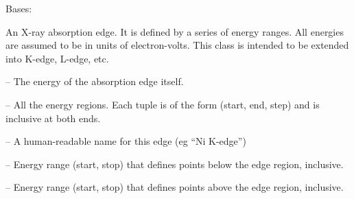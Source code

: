 \documentclass[letterpaper,10pt,english]{sphinxmanual}
\begin{document}
\begin{fulllineitems}
\label{\detokenize{xanespy:xanespy.edges.Edge}}
Bases: 

An X-ray absorption edge. It is defined by a series of energy
ranges. All energies are assumed to be in units of
electron-volts. This class is intended to be extended into K-edge,
L-edge, etc.

\begin{fulllineitems}
\label{\detokenize{xanespy:xanespy.edges.Edge.E_0}}
 -- The energy of the absorption edge itself.

\end{fulllineitems}


\begin{fulllineitems}
\label{\detokenize{xanespy:xanespy.edges.Edge.regions}}
 -- All the energy regions. Each tuple is of the form (start, end,
step) and is inclusive at both ends.

\end{fulllineitems}


\begin{fulllineitems}
\label{\detokenize{xanespy:xanespy.edges.Edge.name}}
 -- A human-readable name for this edge (eg ``Ni K-edge'')

\end{fulllineitems}


\begin{fulllineitems}
\label{\detokenize{xanespy:xanespy.edges.Edge.pre_edge}}
 -- Energy range (start, stop) that defines points below the edge
region, inclusive.

\end{fulllineitems}


\begin{fulllineitems}
\label{\detokenize{xanespy:xanespy.edges.Edge.post_edge}}
 -- Energy range (start, stop) that defines points above the edge
region, inclusive.


\end{fulllineitems}
\end{fulllineitems}
\end{document}
